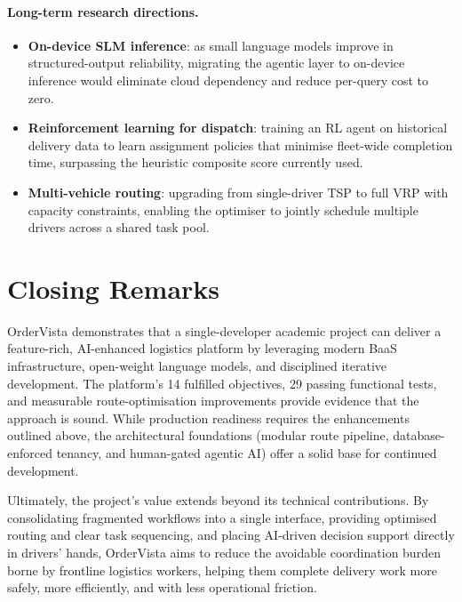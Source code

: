 \paragraph{Long-term research directions.}
\begin{itemize}
  \item \textbf{On-device SLM inference}: as small language models
        improve in structured-output reliability, migrating the agentic
        layer to on-device inference would eliminate cloud dependency
        and reduce per-query cost to zero.
  \item \textbf{Reinforcement learning for dispatch}: training an RL
        agent on historical delivery data to learn assignment policies
        that minimise fleet-wide completion time, surpassing the
        heuristic composite score currently used.
  \item \textbf{Multi-vehicle routing}: upgrading from single-driver
        TSP to full VRP with capacity constraints, enabling the
        optimiser to jointly schedule multiple drivers across a shared
        task pool.
\end{itemize}

\section{Closing Remarks}
\label{sec:closing}

OrderVista demonstrates that a single-developer academic project can
deliver a feature-rich, AI-enhanced logistics platform by leveraging modern
BaaS infrastructure, open-weight language models, and disciplined iterative
development.  The platform's 14 fulfilled objectives, 29 passing functional
tests, and measurable route-optimisation improvements provide evidence that
the approach is sound.  While production readiness requires the
enhancements outlined above, the architectural foundations (modular route
pipeline, database-enforced tenancy, and human-gated agentic AI) offer a
solid base for continued development.

Ultimately, the project's value extends beyond its technical contributions.
By consolidating fragmented workflows into a single interface, providing
optimised routing and clear task sequencing, and placing AI-driven decision
support directly in drivers' hands, OrderVista aims to reduce the
avoidable coordination burden borne by frontline logistics workers, helping
them complete delivery work more safely, more efficiently, and with less
operational friction.
